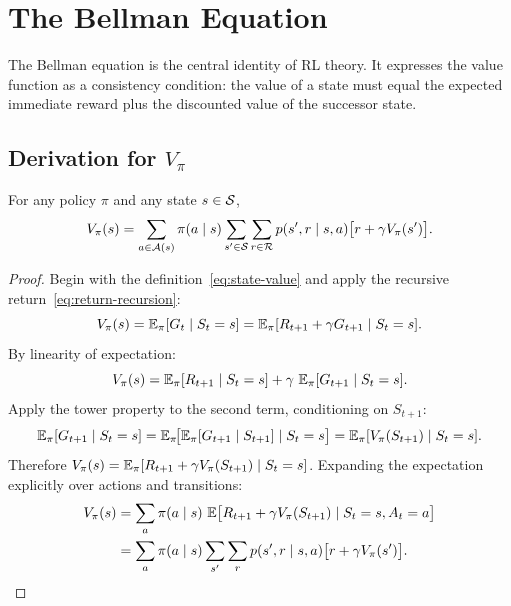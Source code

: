 \section{The Bellman Equation}
\label{sec:bellman-equation}

The Bellman equation is the central identity of RL theory. It expresses the value function as a consistency condition: the value of a state must equal the expected immediate reward plus the discounted value of the successor state.

\subsection*{Derivation for $V_\pi$}

\begin{theorem}
\label{thm:bellman-v}
For any policy $\pi$ and any state $s \in \mathcal{S}$,
\begin{equation}
\label{eq:bellman-v}
V_\pi(s)
= \sum_{a \in \mathcal{A}(s)} \pi(a \mid s)
  \sum_{s' \in \mathcal{S}} \sum_{r \in \mathcal{R}}
  p(s', r \mid s, a)\bigl[r + \gamma V_\pi(s')\bigr].
\end{equation}
\end{theorem}

\begin{proof}
Begin with the definition~\eqref{eq:state-value} and apply the recursive return~\eqref{eq:return-recursion}:
\[
V_\pi(s)
= \operatorname{\mathbb{E}}_\pi[G_t \mid S_t = s]
= \operatorname{\mathbb{E}}_\pi[R_{t+1} + \gamma G_{t+1} \mid S_t = s].
\]
By linearity of expectation:
\[
V_\pi(s) = \operatorname{\mathbb{E}}_\pi[R_{t+1} \mid S_t = s]
           + \gamma\, \operatorname{\mathbb{E}}_\pi[G_{t+1} \mid S_t = s].
\]
Apply the tower property to the second term, conditioning on $S_{t+1}$:
\[
\operatorname{\mathbb{E}}_\pi[G_{t+1} \mid S_t = s]
= \operatorname{\mathbb{E}}_\pi\!\bigl[\operatorname{\mathbb{E}}_\pi[G_{t+1} \mid S_{t+1}] \mid S_t = s\bigr]
= \operatorname{\mathbb{E}}_\pi[V_\pi(S_{t+1}) \mid S_t = s].
\]
Therefore $V_\pi(s) = \operatorname{\mathbb{E}}_\pi[R_{t+1} + \gamma V_\pi(S_{t+1}) \mid S_t = s]$.  Expanding the expectation explicitly over actions and transitions:
\begin{align*}
V_\pi(s)
&= \sum_{a} \pi(a \mid s)\,
   \operatorname{\mathbb{E}}\bigl[R_{t+1} + \gamma V_\pi(S_{t+1}) \mid S_t = s, A_t = a\bigr] \\
&= \sum_{a} \pi(a \mid s)
   \sum_{s'} \sum_{r} p(s', r \mid s, a)\bigl[r + \gamma V_\pi(s')\bigr]. \qedhere
\end{align*}
\end{proof}

